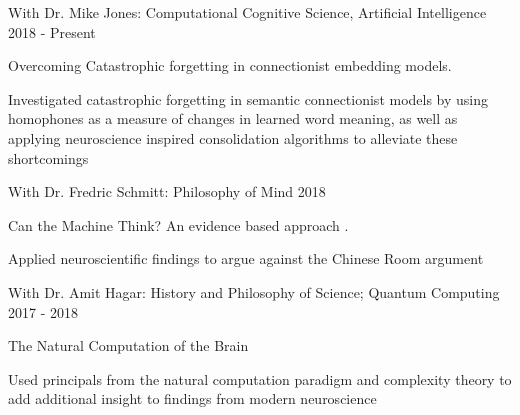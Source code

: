 \begin{cventries}
\cvrpentry
    {With Dr. Mike Jones: Computational Cognitive Science, Artificial Intelligence} %
    {} %
    {} %
    {2018 - Present} %
    {
      \begin{cvrpitems} %
        \item {Overcoming Catastrophic forgetting in connectionist embedding models.}
            \begin{cvitemsdes} 
	     \item{Investigated catastrophic forgetting in semantic connectionist models by using homophones as a measure of changes in learned word meaning, as well as applying neuroscience inspired consolidation algorithms to alleviate these shortcomings}
           \end{cvitemsdes} 
      \end{cvrpitems}
    }

\cvrpentry
    {With Dr. Fredric Schmitt: Philosophy of Mind} %
    {} %
    {} %
    {2018} %
    {
      \begin{cvrpitems} %
        \item {Can the Machine Think? An evidence based approach .}
            \begin{cvitemsdes} 
	     \item{Applied neuroscientific findings to argue against the Chinese Room argument}
           \end{cvitemsdes} 
      \end{cvrpitems}
    }

\cvrpentry
    {With Dr. Amit Hagar: History and Philosophy of Science; Quantum Computing} %
    {} %
    {} %
    {2017 - 2018 } %
    {
      \begin{cvrpitems} %
        \item {The Natural Computation of the Brain}
            \begin{cvitemsdes} 
	     \item{Used principals from the natural computation paradigm and complexity theory to add additional insight to findings from modern neuroscience}
           \end{cvitemsdes} 
      \end{cvrpitems}
    }


\end{cventries}
